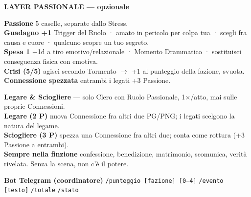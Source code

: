 \documentclass[10pt]{article}
\newcommand{\lbl}[1]{{\cinzel\fontsize{7.5}{9}\selectfont\color{bordoscuro}\bfseries #1}}
\begin{document}
\vspace{4pt}
\begin{mdframed}[backgroundcolor=ororosso!7,linecolor=ororosso,linewidth=0.5pt,
  roundcorner=3pt,innerleftmargin=6pt,innerrightmargin=6pt,
  innertopmargin=3pt,innerbottommargin=4pt,skipabove=0pt,skipbelow=0pt]
{\cinzel\fontsize{8}{10}\selectfont\color{ororosso}\bfseries
  LAYER PASSIONALE — opzionale}
\par\vspace{0.5pt}{\color{ororosso!50}\rule{\linewidth}{0.4pt}}\par\vspace{2pt}

\noindent\begin{minipage}[t]{0.49\linewidth}
{\fontsize{8}{10}\selectfont
\lbl{Passione} 5 caselle, separate dallo Stress.\\
\lbl{Guadagno +1} Trigger del Ruolo · amato in pericolo per colpa tua · scegli fra causa e cuore · qualcuno scopre un tuo segreto.\\
\lbl{Spesa 1} +1d a tiro emotivo/relazionale · Momento Drammatico · sostituisci conseguenza fisica con emotiva.\\
\lbl{Crisi (5/5)} agisci secondo Tormento $\rightarrow$ +1 al punteggio della fazione, svuota.\\
\lbl{Connessione spezzata} entrambi i legati +3 Passione.}
\end{minipage}\hfill
\begin{minipage}[t]{0.49\linewidth}
{\fontsize{8}{10}\selectfont
\lbl{Legare \& Sciogliere} — solo Clero con Ruolo Passionale, 1$\times$/atto, mai sulle proprie Connessioni.\\
\lbl{Legare (2 P)} nuova Connessione fra altri due PG/PNG; i legati scelgono la natura del legame.\\
\lbl{Sciogliere (3 P)} spezza una Connessione fra altri due; conta come rottura (+3 Passione a entrambi).\\
\lbl{Sempre nella finzione} confessione, benedizione, matrimonio, scomunica, verità rivelata. Senza la scena, non c'è il potere.}
\end{minipage}
\end{mdframed}

\vspace{3pt}
{\fontsize{7.5}{9}\selectfont\color{grigionote}
\lbl{Bot Telegram (coordinatore)}\quad
\texttt{/punteggio [fazione] [0--4]}\quad
\texttt{/evento [testo]}\quad
\texttt{/totale}\quad
\texttt{/stato}}
\end{document}

